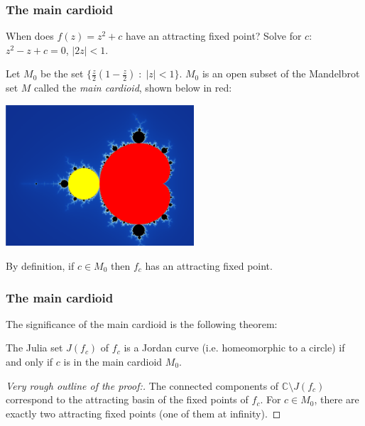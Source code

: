 \documentclass{beamer} %
\theoremstyle{definition} %
\newcommand{\Cplx}{\mathbb{C}}
\begin{document}
\begin{frame}\frametitle{The main cardioid}
    When does $f(z) = z^2+c$ have an attracting fixed point? Solve for $c$:
    $z^2-z+c = 0$, $|2z| < 1$.
    
    Let $M_0$ be the set $\{\frac{z}{2}(1-\frac{z}{2})\;:\;|z|<1\}$. $M_0$ is 
    an open subset of the Mandelbrot set $M$ called the \emph{main cardioid}, shown below in red:
    \begin{center}
        \includegraphics[width=70mm]{img/main-cardioid.png}
    \end{center}
    By definition, if $c \in M_0$ then $f_c$ has an attracting fixed point.
\end{frame}

\begin{frame}\frametitle{The main cardioid}
    The significance of the main cardioid is the following theorem:
    \begin{theorem}
        The Julia set $J(f_c)$ of $f_c$ is a Jordan curve (i.e. homeomorphic to a circle) if and only if $c$ is in the main cardioid $M_0$.
    \end{theorem}
    \begin{proof}[Very rough outline of the proof:]
        The connected components of $\Cplx\setminus J(f_c)$ correspond to the attracting basin of the fixed points of $f_c$. For $c \in M_0$,
        there are exactly two attracting fixed points (one of them at infinity). 
    \end{proof}
\end{frame}

\end{document}
